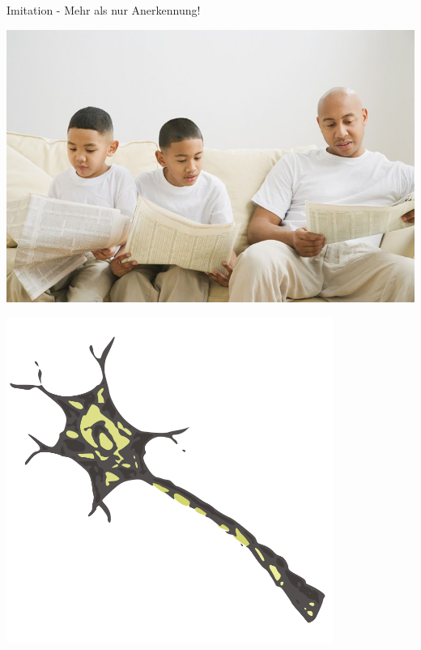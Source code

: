 \documentclass[aspectratio=43,x11names]{beamer}
\begin{document}
\begin{frame}
\begin{center}
\Large Imitation - Mehr als nur Anerkennung!
\medskip\medskip

\includegraphics[scale=0.35]{images/imitation}
\end{center}
\end{frame}

\begin{frame}
\begin{center}
\includegraphics[width=0.8\textwidth, height=0.8\textheight]{images/neuron} 
\end{center}
\end{frame}
\end{document}
